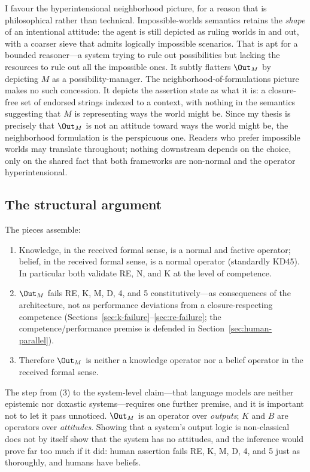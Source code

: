 I favour the hyperintensional neighborhood picture, for a reason that is
philosophical rather than technical. Impossible-worlds semantics retains the
\emph{shape} of an intentional attitude: the agent is still depicted as ruling
worlds in and out, with a coarser sieve that admits logically impossible
scenarios. That is apt for a bounded reasoner---a system trying to rule out
possibilities but lacking the resources to rule out all the impossible ones. It
subtly flatters $\Out_M$ by depicting $M$ as a possibility-manager. The
neighborhood-of-formulations picture makes no such concession. It depicts the
assertion state as what it is: a closure-free set of endorsed strings indexed to
a context, with nothing in the semantics suggesting that $M$ is representing ways
the world might be. Since my thesis is precisely that $\Out_M$ is not an
attitude toward ways the world might be, the neighborhood formulation is the
perspicuous one. Readers who prefer impossible worlds may translate throughout;
nothing downstream depends on the choice, only on the shared fact that both
frameworks are non-normal and the operator hyperintensional.

\subsection{The structural argument}
\label{sec:structural-argument}

The pieces assemble:

\begin{enumerate}
  \item Knowledge, in the received formal sense, is a normal and factive
        operator; belief, in the received formal sense, is a normal operator
        (standardly KD45). In particular both validate RE, N, and K at the level
        of competence.
  \item $\Out_M$ fails RE, K, M, D, 4, and 5 constitutively---as consequences of
        the architecture, not as performance deviations from a closure-respecting
        competence (Sections~\ref{sec:k-failure}--\ref{sec:re-failure}; the
        competence/performance premise is defended in
        Section~\ref{sec:human-parallel}).
  \item Therefore $\Out_M$ is neither a knowledge operator nor a belief operator
        in the received formal sense.
\end{enumerate}

The step from (3) to the system-level claim---that language models are neither
epistemic nor doxastic systems---requires one further premise, and it is
important not to let it pass unnoticed. $\Out_M$ is an operator over
\emph{outputs}; $K$ and $B$ are operators over \emph{attitudes}. Showing that a
system's output logic is non-classical does not by itself show that the system
has no attitudes, and the inference would prove far too much if it did: human
assertion fails RE, K, M, D, 4, and 5 just as thoroughly, and humans have
beliefs.


